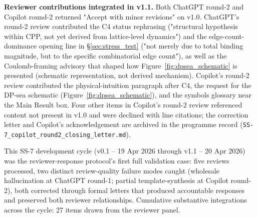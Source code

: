 \documentclass[11pt,letterpaper]{article}
\begin{document}
\textbf{Reviewer contributions integrated in v1.1.} Both ChatGPT round-2 and Copilot round-2 returned "Accept with minor revisions" on v1.0. ChatGPT's round-2 review contributed the C4 status rephrasing ("structural hypothesis within CPP, not yet derived from lattice-level dynamics") and the edge-count-dominance opening line in \S\ref{sec:stress_test} ("not merely due to total binding magnitude, but to the specific combinatorial edge count"), as well as the Coulomb-framing advisory that shaped how Figure~\ref{fig:dpsea_schematic} is presented (schematic representation, not derived mechanism). Copilot's round-2 review contributed the physical-intuition paragraph after C4, the request for the DP-sea schematic (Figure~\ref{fig:dpsea_schematic}), and the symbols glossary near the Main Result box. Four other items in Copilot's round-2 review referenced content not present in v1.0 and were declined with line citations; the correction letter and Copilot's acknowledgement are archived in the programme record (\texttt{SS-7\_copilot\_round2\_closing\_letter.md}).

This SS-7 development cycle (v0.1 -- 19 Apr 2026 through v1.1 -- 20 Apr 2026) was the reviewer-response protocol's first full validation case: five reviews processed, two distinct review-quality failure modes caught (wholesale hallucination at ChatGPT round-1; partial template-synthesis at Copilot round-2), both corrected through formal letters that produced accountable responses and preserved both reviewer relationships. Cumulative substantive integrations across the cycle: 27 items drawn from the reviewer panel.
\end{document}
